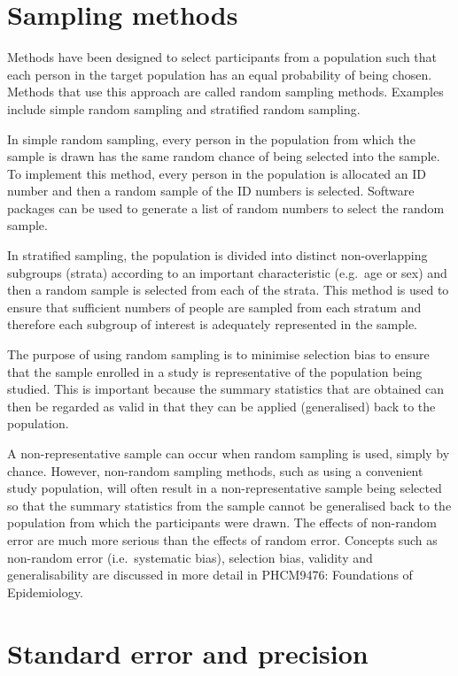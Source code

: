 \documentclass[
]{memoir}
\begin{document}
\hypertarget{sampling-methods}{%
\section{Sampling methods}\label{sampling-methods}}

Methods have been designed to select participants from a population such that each person in the target population has an equal probability of being chosen. Methods that use this approach are called random sampling methods. Examples include simple random sampling and stratified random sampling.

In simple random sampling, every person in the population from which the sample is drawn has the same random chance of being selected into the sample. To implement this method, every person in the population is allocated an ID number and then a random sample of the ID numbers is selected. Software packages can be used to generate a list of random numbers to select the random sample.

In stratified sampling, the population is divided into distinct non-overlapping subgroups (strata) according to an important characteristic (e.g.~age or sex) and then a random sample is selected from each of the strata. This method is used to ensure that sufficient numbers of people are sampled from each stratum and therefore each subgroup of interest is adequately represented in the sample.

The purpose of using random sampling is to minimise selection bias to ensure that the sample enrolled in a study is representative of the population being studied. This is important because the summary statistics that are obtained can then be regarded as valid in that they can be applied (generalised) back to the population.

A non-representative sample can occur when random sampling is used, simply by chance. However, non-random sampling methods, such as using a convenient study population, will often result in a non-representative sample being selected so that the summary statistics from the sample cannot be generalised back to the population from which the participants were drawn. The effects of non-random error are much more serious than the effects of random error. Concepts such as non-random error (i.e.~systematic bias), selection bias, validity and generalisability are discussed in more detail in PHCM9476: Foundations of Epidemiology.

\hypertarget{standard-error-and-precision}{%
\section{Standard error and precision}\label{standard-error-and-precision}}
\end{document}
